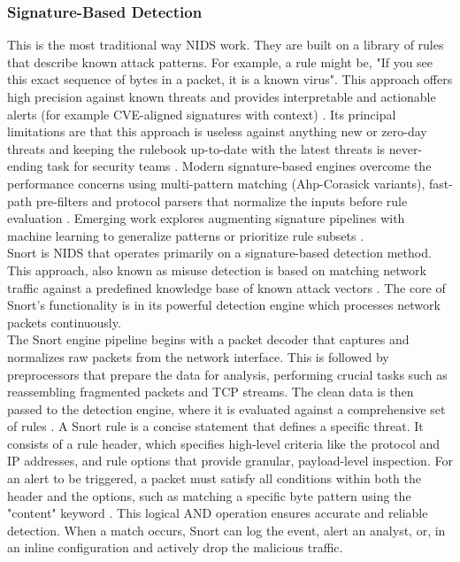 \subsubsection{Signature-Based Detection}
This is the most traditional way NIDS work. They are built on a library of rules that describe known attack patterns. For example, a rule might be, "If you see this exact sequence of bytes in a packet, it is a known virus". This approach offers high precision against known threats and provides interpretable and actionable alerts (for example CVE-aligned signatures with context) \parencite{SnortManual2024,SuricataDocs2025}. Its principal limitations are that this approach is useless against anything new or zero-day threats and keeping the rulebook up-to-date with the latest threats is never-ending task for security teams \parencite{Diana2025Overview,Han2023HPNIDS}. Modern signature-based engines overcome the performance concerns using multi-pattern matching (Ahp-Corasick variants), fast-path pre-filters and protocol parsers that normalize the inputs before rule evaluation \parencite{CiscoSnort3Guide2024}. Emerging work explores augmenting signature pipelines with machine learning to generalize patterns or prioritize rule subsets \parencite{Ahmed2025SignatureML}.\\

\noindent Snort is NIDS that operates primarily on a signature-based detection method. This approach, also known as misuse detection is based on matching network traffic against a predefined knowledge base of known attack vectors \parencite{Sadeghi2020ModernIDS}. The core of Snort's functionality is in its powerful detection engine which processes network packets continuously.\\

\noindent The Snort engine pipeline begins with a packet decoder that captures and normalizes raw packets from the network interface. This is followed by preprocessors that prepare the data for analysis, performing crucial tasks such as reassembling fragmented packets and TCP streams. The clean data is then passed to the detection engine, where it is evaluated against a comprehensive set of rules \parencite{CiscoSnort3Guide2024}. A Snort rule is a concise statement that defines a specific threat. It consists of a rule header, which specifies high-level criteria like the protocol and IP addresses, and rule options that provide granular, payload-level inspection. For an alert to be triggered, a packet must satisfy all conditions within both the header and the options, such as matching a specific byte pattern using the "content" keyword \parencite{SnortManual2024}. This logical AND operation ensures accurate and reliable detection. When a match occurs, Snort can log the event, alert an analyst, or, in an inline configuration and actively drop the malicious traffic.


